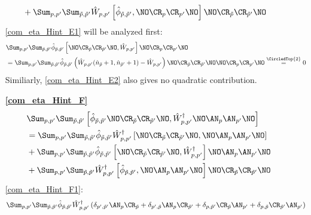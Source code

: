 \begin{appendix}
\begin{itemize}
\begin{subequations}
\begin{align}
&+\Sum_{p, p^\prime}\Sum_{\tilde p,\tilde p^\prime}\hat W_{p,p^\prime} \left[\hat\phi_{\tilde p,\tilde p^\prime},\NO\CR_p\CR_{p^\prime}\NO\right]\NO\CR_{\tilde p}\CR_{\tilde p^\prime}\NO\label{com_eta_Hint_E2}
\end{align}
\end{subequations}
\ref{com_eta_Hint_E1} will be analyzed first:
\begin{align}
&\Sum_{p, p^\prime}\Sum_{\tilde p,\tilde p^\prime} \hat\phi_{\tilde p,\tilde p^\prime}\left[\NO\CR_{\tilde p}\CR_{\tilde p^\prime}\NO,\hat W_{p,p^\prime}\right]\NO\CR_p\CR_{p^\prime}\NO\nonumber\\
&=\Sum_{p, p^\prime}\Sum_{\tilde p,\tilde p^\prime} \hat\phi_{\tilde p,\tilde p^\prime}\left(\hat W_{p,p^\prime}(\hat n_{\tilde p}+1,\hat n_{\tilde p^\prime}+1)-\hat W_{p,p^\prime}\right)\NO\CR_{\tilde p}\CR_{\tilde p^\prime}\NO\NO\CR_p\CR_{p^\prime}\NO\overset{\CircledTop{2}}{=}0
\end{align}
Similiarly, \ref{com_eta_Hint_E2} also gives no quadratic contribution.
\item[\textbf{\ref{com_eta_Hint_F}}] 
\begin{subequations}
\begin{align}
&\Sum_{p, p^\prime}\Sum_{\tilde p,\tilde p^\prime} \left[\hat\phi_{\tilde p,\tilde p^\prime}\NO\CR_{\tilde p}\CR_{\tilde p^\prime}\NO,\hat W_{p,p^\prime}^\dagger\NO\AN_p\AN_{p^\prime}\NO\right]\nonumber\\
&=\Sum_{p, p^\prime}\Sum_{\tilde p,\tilde p^\prime} \hat\phi_{\tilde p,\tilde p^\prime}\hat W_{p,p^\prime}^\dagger\left[\NO\CR_{\tilde p}\CR_{\tilde p^\prime}\NO,\NO\AN_p\AN_{p^\prime}\NO\right]\label{com_eta_Hint_F1}\\
&+\Sum_{p, p^\prime}\Sum_{\tilde p,\tilde p^\prime}\hat\phi_{\tilde p,\tilde p^\prime} \left[\NO\CR_{\tilde p}\CR_{\tilde p^\prime}\NO,\hat W_{p,p^\prime}^\dagger\right]\NO\AN_p\AN_{p^\prime}\NO\label{com_eta_Hint_F2}\\
&+\Sum_{p, p^\prime}\Sum_{\tilde p,\tilde p^\prime}\hat W_{p,p^\prime}^\dagger \left[\hat\phi_{\tilde p,\tilde p^\prime},\NO\AN_p\AN_{p^\prime}\NO\right]\NO\CR_{\tilde p}\CR_{\tilde p^\prime}\NO\label{com_eta_Hint_F3}
\end{align}
\end{subequations}
\ref{com_eta_Hint_F1}:
\begin{align}
&\Sum_{p, p^\prime}\Sum_{\tilde p,\tilde p^\prime} \hat\phi_{\tilde p,\tilde p^\prime}\hat W_{p,p^\prime}^\dagger\left(\delta_{p^\prime,\tilde p^\prime}\AN_p\CR_{\tilde p}+\delta_{p^\prime,\tilde p}\AN_p\CR_{\tilde p^\prime}+\delta_{p,\tilde p^\prime}\CR_{\tilde p}\AN_{p^\prime}+\delta_{p,\tilde p}\CR_{\tilde p^\prime}\AN_{p^\prime}\right)\nonumber\\

\end{align}
\end{itemize}
\end{appendix}
